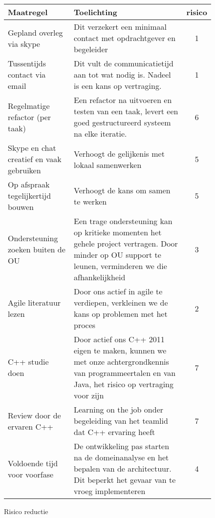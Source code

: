 \begin{figure}[!ht]
\begin{center}
\small\sf
\begin{tabular}{|p{17em}p{22em}c|}
\hline
    {\bf Maatregel} & {\bf Toelichting} & {\bf risico} \\\hline
    Gepland overleg via skype & Dit verzekert een minimaal contact met opdrachtgever en begeleider & 1\\\hline
    Tussentijds contact via email & Dit vult de communicatietijd aan tot wat nodig is. Nadeel is
				    een kans op vertraging. & 1\\\hline
    Regelmatige refactor (per taak) & Een refactor na uitvoeren en testen van een taak, levert
					een goed gestructureerd systeem na elke iteratie. & 6\\\hline
    Skype en chat creatief en vaak gebruiken & Verhoogt de gelijkenis met lokaal samenwerken & 5\\\hline
    Op afspraak tegelijkertijd bouwen & Verhoogt de kans om samen te werken & 5\\\hline
    Ondersteuning zoeken buiten de OU & Een trage ondersteuning kan op kritieke momenten
					het gehele project vertragen. Door minder op
					OU support te leunen, verminderen we die afhankelijkheid & 3\\\hline
    Agile literatuur lezen & Door ons actief in agile te verdiepen, verkleinen we de kans op
				problemen met het proces & 2\\\hline
    C++ studie doen & Door actief ons C++ 2011 eigen te maken, kunnen we
			met onze achtergrondkennis van programmeertalen en
			van Java, het risico op vertraging voor zijn & 7\\\hline
    Review door de ervaren C++ & Learning on the job onder begeleiding van
				het teamlid dat C++ ervaring heeft & 7\\\hline
    Voldoende tijd voor voorfase & De ontwikkeling pas starten na de domeinanalyse en het bepalen van de
			architectuur. Dit beperkt het gevaar van te vroeg implementeren & 4\\\hline
\end{tabular}
\end{center}
 \caption{Risico reductie}\label{fig: risico reductie}
\end{figure}